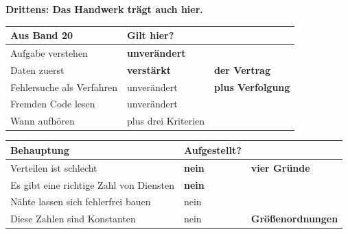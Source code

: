 \begin{merksatz}
\begin{center}
\begin{minipage}{0.88\textwidth}
\end{minipage}
\end{center}

\textbf{Drittens: Das Handwerk trägt auch hier.}

\begin{center}
\renewcommand{\arraystretch}{1.5}
\begin{tabular}{@{}P{3.0cm}P{2.2cm}P{2.6cm}@{}}
\toprule
\textbf{Aus Band 20} & \textbf{Gilt hier?} & \\
\midrule
Aufgabe verstehen & \textcolor{gruen}{\textbf{unverändert}} & \\
Daten zuerst & \textcolor{gruen}{\textbf{verstärkt}} & \textbf{der Vertrag}\\
Fehlersuche als Verfahren & \textcolor{gruen}{unverändert} & \textbf{plus Verfolgung}\\
Fremden Code lesen & \textcolor{gruen}{unverändert} & \\
Wann aufhören & \textcolor{gruen}{plus drei Kriterien} & \\
\bottomrule
\end{tabular}
\end{center}

\begin{center}
\end{center}

\begin{warnung}
\begin{center}
\renewcommand{\arraystretch}{1.5}
\begin{tabular}{@{}P{3.4cm}P{2.2cm}P{2.2cm}@{}}
\toprule
\textbf{Behauptung} & \textbf{Aufgestellt?} & \\
\midrule
Verteilen ist schlecht & \textcolor{akzent}{\textbf{nein}} & \textbf{vier Gründe}\\
Es gibt eine richtige Zahl von Diensten & \textcolor{akzent}{\textbf{nein}} & \\
Nähte lassen sich fehlerfrei bauen & \textcolor{akzent}{nein} & \\
Diese Zahlen sind Konstanten & \textcolor{akzent}{nein} & \textbf{Größen\-ordnungen}\\
\bottomrule
\end{tabular}
\end{center}


\end{warnung}
\end{merksatz}
